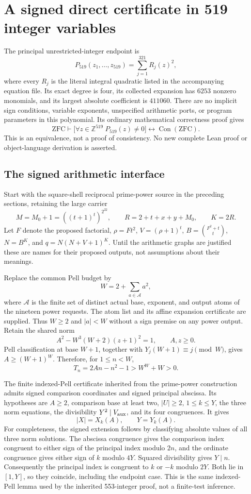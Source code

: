 \section{A signed direct certificate in 519 integer variables}
\label{sec:direct519}

The principal unrestricted-integer endpoint is
\[
  P_{519}(z_1,\ldots,z_{519})=\sum_{j=1}^{321}R_j(z)^2,
\]
where every $R_j$ is the literal integral quadratic listed in the
accompanying equation file.  Its exact degree is four, its collected
expansion has $6253$ nonzero monomials, and its largest absolute
coefficient is $411060$.  There are no implicit sign conditions,
variable exponents, unspecified arithmetic ports, or program parameters
in this polynomial.  Its ordinary mathematical correctness proof gives
\[
 \mathrm{ZFC}\vdash
 \bigl[\forall z\in\mathbb Z^{519}\;P_{519}(z)\ne0\bigr]
 \longleftrightarrow\operatorname{Con}(\mathrm{ZFC}).
\]
This is an equivalence, not a proof of consistency.  No new complete
Lean proof or object-language derivation is asserted.

\subsection{The signed arithmetic interface}

Start with the square-shell reciprocal prime-power source in the preceding
sections, retaining the large carrier
\[
 M=M_0+1=((t+1)^t)^{2^{22}},\qquad
 R=2+t+x+y+M_0,\qquad K=2R.
\]
Let $F$ denote the proposed factorial, $\rho=Ft^2$,
$V=(\rho+1)^t$, $B=\binom{F^2+t}{t}$, $N=B^K$, and
$q=N(N+V+1)^K$.  Until the arithmetic graphs are justified these are
names for their proposed outputs, not assumptions about their meanings.

Replace the common Pell budget by
\[
 W=2+\sum_{a\in\mathcal A}a^2,
\]
where $\mathcal A$ is the finite set of distinct actual base, exponent,
and output atoms of the nineteen power requests.  The atom list and its
affine expansion certificate are supplied.  Thus $W\ge2$ and $|a|<W$
without a sign premise on any power output.  Retain the shared norm
\[
 A^2-W^3(W+2)(z+1)^2=1,\qquad A,z\ge0.
\]
Pell classification at base $W+1$, together with
$Y_j(W+1)\equiv j\pmod W$, gives
$A\ge(W+1)^W$.  Therefore, for $1\le n<W$,
\[
 T_n=2An-n^2-1>W^W+W>0.
\]

The finite indexed-Pell certificate inherited from the prime-power
construction admits signed comparison coordinates and signed principal
abscissa.  Its hypotheses are $A\ge2$, comparison base at least two,
$|U|\ge2$, $1\le k\le Y$, the three norm equations, the divisibility
$Y^2\mid V_{\rm aux}$, and its four congruences.  It gives
\[
 |X|=X_k(A),\qquad Y=Y_k(A).
\]
For completeness, the signed extension follows by classifying absolute
values of all three norm solutions.  The abscissa congruence gives the
comparison index congruent to either sign of the principal index modulo
$2n$, and the ordinate congruence gives either sign of $k$ modulo $4Y$.
Squared divisibility gives $Y\mid n$.  Consequently the principal index
is congruent to $k$ or $-k$ modulo $2Y$.  Both lie in $[1,Y]$, so they
coincide, including the endpoint case.  This is the same indexed-Pell
lemma used by the inherited 553-integer proof, not a finite-test inference.

